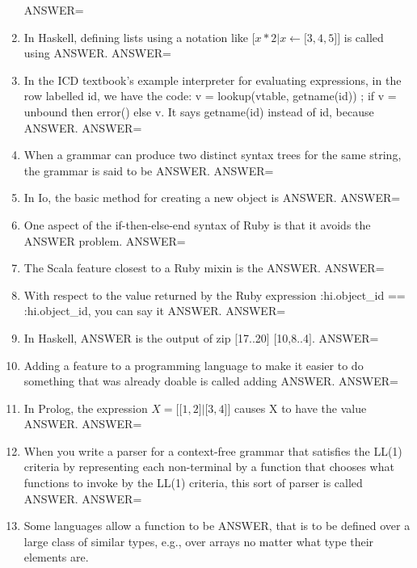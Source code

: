 \documentclass{exam}
\begin{document}
\begin{enumerate}
ANSWER=
\item In Haskell, defining lists using a notation like $\lbrack x * 2 | x \leftarrow \lbrack 3, 4, 5\rbrack \rbrack$ is called using ANSWER.\newline
ANSWER=
\item In the ICD textbook's example interpreter for evaluating expressions, in the row labelled id, we have the code: v = lookup(vtable, getname(id)) ; if v = unbound then error() else v.  It says getname(id) instead of id, because ANSWER.\newline
ANSWER=
\item When a grammar can produce two distinct syntax trees for the same string, the grammar is said to be ANSWER.\newline
ANSWER=
\item In Io, the basic method for creating a new object is ANSWER.\newline
ANSWER=
\item One aspect of the if-then-else-end syntax of Ruby is that it avoids the ANSWER problem.\newline
ANSWER=
\item The Scala feature closest to a Ruby mixin is the ANSWER.\newline
ANSWER=
\item With respect to the value returned by the Ruby expression :hi.object\_id == :hi.object\_id, you can say it ANSWER.\newline
ANSWER=
\item In Haskell, ANSWER is the output of zip $\lbrack$17..20$\rbrack$ $\lbrack$10,8..4$\rbrack$.\newline
ANSWER=
\item Adding a feature to a programming language to make it easier to do something that was already doable is called adding ANSWER.\newline
ANSWER=
\item In Prolog, the expression $X = \lbrack \lbrack 1,2\rbrack | \lbrack 3,4\rbrack \rbrack$ causes X to have the value ANSWER.\newline
ANSWER=
\item When you write a parser for a context-free grammar that satisfies the LL(1) criteria by representing each non-terminal by a function that chooses what functions to invoke by the LL(1) criteria, this sort of parser is called ANSWER.\newline
ANSWER=
\item Some languages allow a function to be ANSWER, that is to be defined over a large class of similar types, e.g., over arrays no matter what type their elements are.\newline

\end{enumerate}
\end{document}
